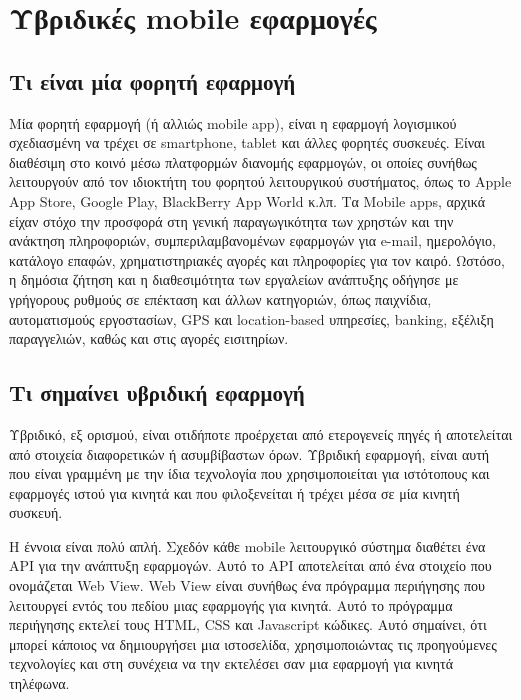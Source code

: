 \documentclass[a4paper,12pt]{article}
\begin{document}
	\newpage
	\section{Υβριδικές mobile εφαρμογές}
	
		\subsection{Τι είναι μία φορητή εφαρμογή}
		
			Μία φορητή εφαρμογή (ή αλλιώς mobile app), είναι η εφαρμογή λογισμικού σχεδιασμένη να
			τρέχει σε smartphone, tablet και άλλες φορητές συσκευές. Είναι διαθέσιμη στο κοινό μέσω πλατφορμών διανομής εφαρμογών, οι οποίες συνήθως λειτουργούν από τον
			ιδιοκτήτη του φορητού λειτουργικού συστήματος, όπως το Apple App Store, Google Play, BlackBerry App World κ.λπ.
			Τα Mobile apps, αρχικά είχαν στόχο την προσφορά στη γενική παραγωγικότητα των χρηστών και
			την ανάκτηση πληροφοριών, συμπεριλαμβανομένων εφαρμογών για e-mail, ημερολόγιο, κατάλογο
			επαφών, χρηματιστηριακές αγορές και πληροφορίες για τον καιρό. Ωστόσο, η δημόσια ζήτηση και
			η διαθεσιμότητα των εργαλείων ανάπτυξης οδήγησε με γρήγορους ρυθμούς σε επέκταση και άλλων
			κατηγοριών, όπως παιχνίδια, αυτοματισμούς εργοστασίων, GPS και location-based υπηρεσίες,
			banking, εξέλιξη παραγγελιών, καθώς και στις αγορές εισιτηρίων.
		
		\subsection{Τι σημαίνει υβριδική εφαρμογή}
		
			Υβριδικό, εξ ορισμού, είναι οτιδήποτε προέρχεται από ετερογενείς πηγές ή αποτελείται από στοιχεία διαφορετικών ή ασυμβίβαστων όρων. Υβριδική εφαρμογή, είναι αυτή που 
			είναι γραμμένη με την ίδια τεχνολογία που χρησιμοποιείται για ιστότοπους και εφαρμογές ιστού για κινητά και που φιλοξενείται ή τρέχει μέσα σε μία κινητή συσκευή. 
				
			Η έννοια είναι πολύ απλή. Σχεδόν κάθε mobile λειτουργικό σύστημα διαθέτει ένα API για την ανάπτυξη εφαρμογών. 
			Αυτό το API αποτελείται από ένα στοιχείο που ονομάζεται Web View. Web View είναι συνήθως ένα πρόγραμμα περιήγησης που λειτουργεί εντός του πεδίου μιας εφαρμογής για κινητά. 
			Αυτό το πρόγραμμα περιήγησης εκτελεί τους HTML, CSS και Javascript κώδικες. Αυτό σημαίνει, ότι μπορεί κάποιος να δημιουργήσει μια ιστοσελίδα, χρησιμοποιώντας τις προηγούμενες 
			τεχνολογίες και στη συνέχεια να την εκτελέσει σαν μια εφαρμογή για κινητά τηλέφωνα.
							
\end{document}
